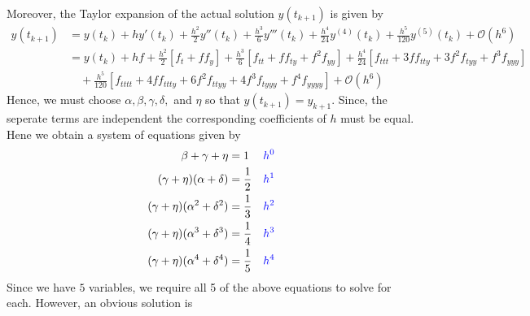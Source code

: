 \documentclass[11.5pt]{article}
\newcommand\BLK{\color{black}}
\newcommand\BLU{\color{blue}}
\begin{document}
Moreover, the Taylor expansion of the actual solution $y(t_{k+1})$ is given by
\begin{align*}
y(t_{k+1}) &= y(t_k) + hy'(t_k) + \frac{h^2}{2}y''(t_k) + \frac{h^3}{6}y'''(t_k) + \frac{h^4}{24}y^{(4)}(t_k) + \frac{h^5}{120}y^{(5)}(t_k) + \mathcal{O}(h^6)\\
&= y(t_k) + hf + \frac{h^2}{2}\left[f_t + ff_y \right] + \frac{h^3}{6}\left[f_{tt} + ff_{ty} + f^2f_{yy} \right] + \frac{h^4}{24}\left[ f_{ttt} + 3ff_{tty} + 3f^2f_{tyy} + f^3f_{yyy}\right]\\ &\quad + \frac{h^5}{120}\left[f_{tttt} + 4ff_{ttty} + 6f^2f_{ttyy} + 4f^3f_{tyyy}+f^4f_{yyyy} \right] + \mathcal{O}(h^6)
\end{align*}
Hence, we must choose $\alpha,\beta,\gamma,\delta,$ and $\eta$ so that $y(t_{k+1}) = y_{k+1}$. Since, the seperate terms are independent the corresponding coefficients of $h$ must be equal. Hene we obtain a system of equations given by
\begin{align*}
\beta + \gamma + \eta &= 1 & \BLU h^0 \BLK\\
(\gamma+\eta)(\alpha +\delta)&= \frac{1}{2} & \BLU h^1 \BLK\\
(\gamma + \eta)(\alpha^2+\delta^2) &= \frac{1}{3} & \BLU h^2 \BLK\\
(\gamma +\eta)(\alpha^3+\delta^3)  &= \frac{1}{4} & \BLU h^3 \BLK\\
(\gamma +\eta)(\alpha^4+\delta^4) &= \frac{1}{5} & \BLU h^4 \BLK\\
\end{align*}
Since we have $5$ variables, we require all 5 of the above equations to solve for each. However, an obvious solution is 
\end{document}

